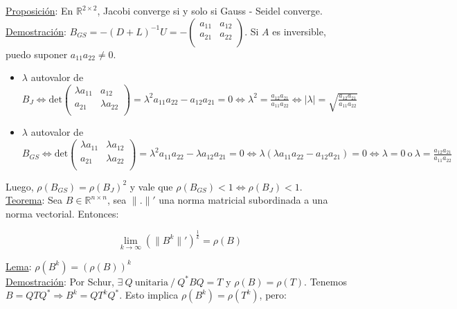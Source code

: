 \underline{Proposici\'on}: En $\mathbb{R}^{2 \times 2}$, Jacobi converge si y solo si Gauss - Seidel converge.\\

\underline{Demostraci\'on}: $ B_{GS} = -(D + L)^{-1}U = -
	\begin{pmatrix}
        a_{11} & a_{12}\\
        a_{21} & a_{22}\\
	\end{pmatrix}
$. Si $A$ es inversible, puedo suponer $a_{11}a_{22} \neq 0$.\\

\begin{itemize}
	\item $\lambda$ autovalor de $B_{J} \iff \text{det}\begin{pmatrix}
        \lambda a_{11} & a_{12}\\
        a_{21} & \lambda a_{22}\\
	\end{pmatrix} = \lambda^{2}a_{11}a_{22} - a_{12}a_{21} = 0 \iff \lambda^{2} = \frac{a_{12}a_{21}}{a_{11}a_{22}} \iff |\lambda| = \sqrt{\frac{a_{12}a_{21}}{a_{11}a_{22}}}$
	
	\item $\lambda$ autovalor de $B_{GS} \iff \text{det}\begin{pmatrix}
        \lambda a_{11} & \lambda a_{12}\\
        a_{21} & \lambda a_{22}\\
	\end{pmatrix} = \lambda^{2}a_{11}a_{22} - \lambda a_{12}a_{21} = 0 \iff \lambda(\lambda a_{11}a_{22} - a_{12}a_{21}) = 0 \iff \lambda = 0\ \text{o}\ \lambda = \frac{a_{12}a_{21}}{a_{11}a_{22}}$
\end{itemize}

Luego, $\rho(B_{GS}) = \rho(B_{J})^{2}$ y vale que $\rho(B_{GS}) < 1 \iff \rho(B_{J}) < 1$.\\

\underline{Teorema}: Sea $B \in \mathbb{R}^{n \times n}$, sea $\|.\|'$ una norma matricial subordinada a una norma vectorial. Entonces:

$$\lim \limits_{k \rightarrow \infty} (\|B^{k}\|')^{\frac{1}{k}} = \rho(B)$$

\underline{Lema}: $\rho(B^{k}) = (\rho(B))^{k}$\\

\underline{Demostraci\'on}: Por Schur, $\exists \ Q\ \text{unitaria}\ / \ Q^{*}BQ = T$ y $\rho(B) = \rho(T)$. Tenemos $B = QTQ^{*} \Rightarrow B^{k} = QT^{k}Q^{*}$. Esto implica $\rho(B^{k}) = \rho(T^{k})$, pero:

